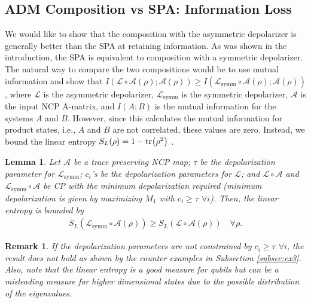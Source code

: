 \documentclass[12pt]{iopart}
\newtheorem{lemma}{Lemma}
\newtheorem*{remark}{Remark}
\begin{document}
\subsection{ADM Composition vs SPA: Information Loss}
We would like to show that the composition with the asymmetric depolarizer is generally better than the SPA at retaining information. As was shown in the introduction, the SPA is equivalent to composition with a symmetric depolarizer. The natural way to compare the two compositions would be to use mutual information and show that $I(\mathcal{L}\circ\mathcal{A}(\rho);\mathcal{A}(\rho))\geq I(\mathcal{L}_\text{symm}\circ\mathcal{A}(\rho);\mathcal{A}(\rho))$, where $\mathcal{L}$ is the asymmetric depolarizer, $\mathcal{L}_\text{symm}$ is the symmetric depolarizer, $\mathcal{A}$ is the input NCP A-matrix, and $I(A;B)$ is the mutual information for the systems $A$ and $B$. However, since this calculates the mutual information for product states, i.e., $A$ and $B$ are not correlated, these values are zero. Instead, we bound the linear entropy $S_L(\rho)=1-\tr(\rho^2)$ \cite{Peters2004MixedStateSensitivity}.
\begin{lemma}
    Let $\mathcal{A}$ be a trace preserving NCP map; $\tau$ be the depolarization parameter for $\mathcal{L}_\text{symm}$; $c_i$'s be the depolarization parameters for $\mathcal{L}$; and $\mathcal{L}\circ\mathcal{A}$ and $\mathcal{L}_\text{symm}\circ\mathcal{A}$ be CP with the minimum depolarization required (minimum depolarization is given by maximizing $M_1$ with $c_i\geq \tau$ $\forall i$). Then, the linear entropy is bounded by
    \begin{align}
        S_L(\mathcal{L}_\text{symm}\circ\mathcal{A}(\rho))\geq S_L(\mathcal{L}\circ\mathcal{A}(\rho))\quad \forall \rho.
    \end{align}
\end{lemma}
\begin{remark}
    If the depolarization parameters are \textit{not} constrained by $c_i\geq \tau$ $\forall i$, the result does not hold as shown by the counter examples in Subsection \ref{subsec:ex3}. Also, note that the linear entropy is a good measure for qubits but can be a misleading measure for higher dimensional states due to the possible distribution of the eigenvalues.
\end{remark}
\end{document}
